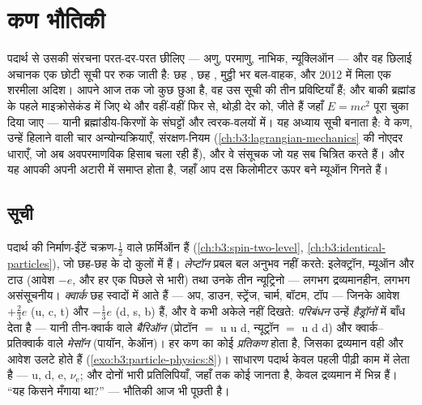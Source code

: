 \chapter{कण भौतिकी}\label{ch:b3:particle-physics}


पदार्थ से उसकी संरचना परत-दर-परत छीलिए --- अणु, परमाणु,
नाभिक, न्यूक्लिऑन --- और वह छिलाई अचानक एक छोटी सूची पर रुक जाती है:
छह \emph{}, छह \emph{}, मुट्ठी भर बल-वाहक,
और 2012 में मिला एक शरमीला अदिश। आपने आज तक जो कुछ छुआ है, वह उस सूची
की तीन प्रविष्टियाँ हैं; और बाकी ब्रह्मांड के पहले माइक्रोसेकंड में
जिए थे और वहीं-वहीं फिर से, थोड़ी देर को, जीते हैं जहाँ
$E = mc^2$ पूरा चुका दिया जाए --- यानी ब्रह्मांडीय-किरणों के संघट्टों
और त्वरक-वलयों में। यह अध्याय सूची बनाता है: वे कण, उन्हें हिलाने
वाली चार अन्योन्यक्रियाएँ, संरक्षण-नियम
(\cref{ch:b3:lagrangian-mechanics} की नोएदर धाराएँ, जो अब
अवपरमाणविक हिसाब चला रही हैं), और वे संसूचक जो यह सब चित्रित करते
हैं। और यह आपकी अपनी अटारी में समाप्त होता है, जहाँ आप दस किलोमीटर
ऊपर बने म्यूऑन गिनते हैं।

\section{सूची}

\begin{definition}[लेप्टॉन, क्वार्क, हैड्रॉन]\label{def:b3:particle-physics:zoo}
पदार्थ की निर्माण-ईंटें चक्रण-$\tfrac12$ वाले फ़र्मिऑन हैं
(\cref{ch:b3:spin-two-level}, \cref{ch:b3:identical-particles}), जो
छह-छह के दो कुलों में हैं। \emph{लेप्टॉन} प्रबल बल अनुभव नहीं करते:
इलेक्ट्रॉन, म्यूऑन और टाउ (आवेश $-e$, और हर एक पिछले से भारी)
तथा उनके तीन न्यूट्रिनो --- लगभग द्रव्यमानहीन, लगभग
असंसूचनीय। \emph{क्वार्क} छह स्वादों में आते हैं --- अप, डाउन,
स्ट्रेंज, चार्म, बॉटम, टॉप --- जिनके आवेश $+\tfrac23e$ (u, c,
t) और $-\tfrac13e$ (d, s, b) हैं, और वे कभी अकेले नहीं दिखते:
\emph{परिबंधन} उन्हें \emph{हैड्रॉनों} में बाँध देता है --- यानी
तीन-क्वार्क वाले \emph{बैरिऑन} (प्रोटॉन $=$ u u d, न्यूट्रॉन $=$ u d d) और
क्वार्क--प्रतिक्वार्क वाले \emph{मेसॉन} (पायॉन, केऑन)। हर कण का कोई
\emph{प्रतिकण} होता है, जिसका द्रव्यमान वही और आवेश उलटे होते हैं
(\cref{exo:b3:particle-physics:8})। साधारण पदार्थ केवल
पहली पीढ़ी काम में लेता है --- u, d, e, $\nu_{\text{e}}$; और दोनों
भारी प्रतिलिपियाँ, जहाँ तक कोई जानता है, केवल द्रव्यमान में भिन्न
हैं। ``यह किसने मँगाया था?'' --- भौतिकी आज भी पूछती है।
\end{definition}

